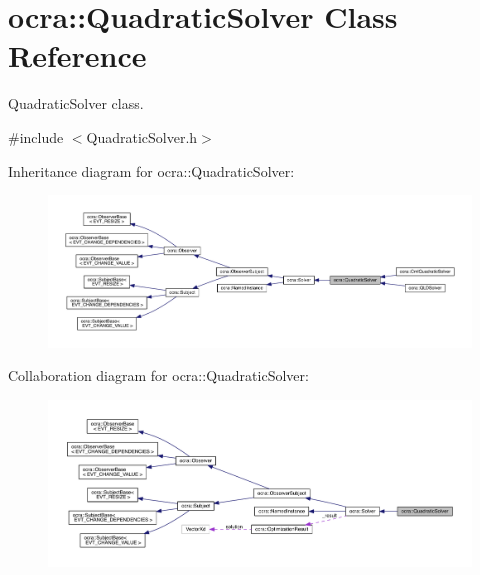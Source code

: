 \hypertarget{classocra_1_1QuadraticSolver}{}\section{ocra\+:\+:Quadratic\+Solver Class Reference}
\label{classocra_1_1QuadraticSolver}


Quadratic\+Solver class.  




{\ttfamily \#include $<$Quadratic\+Solver.\+h$>$}



Inheritance diagram for ocra\+:\+:Quadratic\+Solver\+:\nopagebreak
\begin{figure}[H]
\begin{center}
\leavevmode
\includegraphics[width=350pt]{dd/ddf/classocra_1_1QuadraticSolver__inherit__graph}
\end{center}
\end{figure}


Collaboration diagram for ocra\+:\+:Quadratic\+Solver\+:\nopagebreak
\begin{figure}[H]
\begin{center}
\leavevmode
\includegraphics[width=350pt]{dd/dc5/classocra_1_1QuadraticSolver__coll__graph}
\end{center}
\end{figure}
